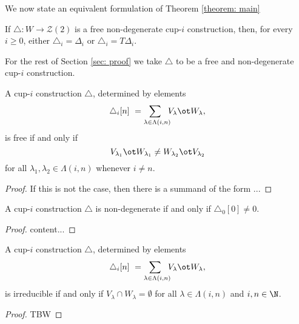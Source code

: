 We now state an equivalent formulation of Theorem \ref{theorem: main}

\begin{theorem} \label{theorem: main reformulated}
	If $\triangle : W \to \mathcal{Z}(2)$ is a free non-degenerate cup-$i$ construction, then, for every $i \geq 0$, either $\triangle_i = \Delta_i$ or $\triangle_i = T \Delta_i$.
\end{theorem}

For the rest of Section \ref{sec: proof} we take $\triangle$ to be a free and non-degenerate cup-$i$ construction.



\begin{lemma} \label{l:freeness recasted}
	A cup-$i$ construction $\triangle$, determined by elements
	\[
	\triangle_i [n] \ =
	\sum_{\lambda \in \Lambda(i,n) \kern-5pt} V_\lambda \ot W_\lambda,
	\]
	is free if and only if
	\[
	V_{\lambda_1} \ot W_{\lambda_1} \neq
	W_{\lambda_2} \ot V_{\lambda_2}
	\]
	for all $\lambda_1, \lambda_2 \in \Lambda(i,n)$ whenever $i \neq n$.
\end{lemma}

\begin{proof}
	If this is not the case, then there is a summand of the form ...
\end{proof}

\begin{lemma} \label{l:non-degeneracy recasted}
	A cup-$i$ construction $\triangle$ is non-degenerate if and only if $\triangle_0 [0] \neq 0$.
\end{lemma}

\begin{proof}
	content...
\end{proof}

\begin{lemma} \label{l:irreducibility recasted}
	A cup-$i$ construction $\triangle$, determined by elements
	\[
	\triangle_i [n] \ =
	\sum_{\lambda \in \Lambda(i,n) \kern-5pt} V_\lambda \ot W_\lambda,
	\]
	is irreducible if and only if $V_\lambda \cap W_\lambda = \emptyset$ for all $\lambda \in \Lambda(i,n)$ and $i, n \in \N$.
\end{lemma}

\begin{proof}
	TBW
\end{proof}



%


